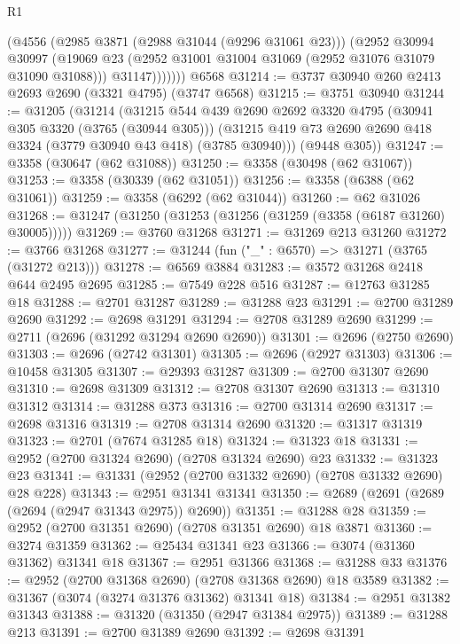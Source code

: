 \begin{lexlean}{R1}
\begin{coremodule}
              (@4556
                (@2985 @3871 (@2988 @31044 (@9296 @31061 @23)))
                (@2952
                  @30994
                  @30997
                  (@19069 @23 (@2952 @31001 @31004 @31069 (@2952 @31076 @31079 @31090 @31088)))
                  @31147)))))))
    @6568
@31214 := @3737 @30940 @260 @2413 @2693 @2690 (@3321 @4795) (@3747 @6568)
@31215 := @3751 @30940
@31244 := @31205
    (@31214
      (@31215
        @544
        @439
        @2690
        @2692
        @3320
        @4795
        (@30941 @305 @3320 (@3765 (@30944 @305)))
        (@31215 @419 @73 @2690 @2690 @418 @3324 (@3779 @30940 @43 @418) (@3785 @30940)))
      (@9448 @305))
@31247 := @3358 (@30647 (@62 @31088))
@31250 := @3358 (@30498 (@62 @31067))
@31253 := @3358 (@30339 (@62 @31051))
@31256 := @3358 (@6388 (@62 @31061))
@31259 := @3358 (@6292 (@62 @31044))
@31260 := @62 @31026
@31268 := @31247 (@31250 (@31253 (@31256 (@31259 (@3358 (@6187 @31260) @30005)))))
@31269 := @3760 @31268
@31271 := @31269 @213 @31260
@31272 := @3766 @31268
@31277 := @31244 (fun ("_" : @6570) => @31271 (@3765 (@31272 @213)))
@31278 := @6569 @3884
@31283 := @3572 @31268 @2418 @644 @2495 @2695
@31285 := @7549 @228 @516
@31287 := @12763 @31285 @18
@31288 := @2701 @31287
@31289 := @31288 @23
@31291 := @2700 @31289 @2690
@31292 := @2698 @31291
@31294 := @2708 @31289 @2690
@31299 := @2711 (@2696 (@31292 @31294 @2690 @2690))
@31301 := @2696 (@2750 @2690)
@31303 := @2696 (@2742 @31301)
@31305 := @2696 (@2927 @31303)
@31306 := @10458 @31305
@31307 := @29393 @31287
@31309 := @2700 @31307 @2690
@31310 := @2698 @31309
@31312 := @2708 @31307 @2690
@31313 := @31310 @31312
@31314 := @31288 @373
@31316 := @2700 @31314 @2690
@31317 := @2698 @31316
@31319 := @2708 @31314 @2690
@31320 := @31317 @31319
@31323 := @2701 (@7674 @31285 @18)
@31324 := @31323 @18
@31331 := @2952 (@2700 @31324 @2690) (@2708 @31324 @2690) @23
@31332 := @31323 @23
@31341 := @31331 (@2952 (@2700 @31332 @2690) (@2708 @31332 @2690) @28 @228)
@31343 := @2951 @31341 @31341
@31350 := @2689 (@2691 (@2689 (@2694 (@2947 @31343 @2975)) @2690))
@31351 := @31288 @28
@31359 := @2952 (@2700 @31351 @2690) (@2708 @31351 @2690) @18 @3871
@31360 := @3274 @31359
@31362 := @25434 @31341 @23
@31366 := @3074 (@31360 @31362) @31341 @18
@31367 := @2951 @31366
@31368 := @31288 @33
@31376 := @2952 (@2700 @31368 @2690) (@2708 @31368 @2690) @18 @3589
@31382 := @31367 (@3074 (@3274 @31376 @31362) @31341 @18)
@31384 := @2951 @31382 @31343
@31388 := @31320 (@31350 (@2947 @31384 @2975))
@31389 := @31288 @213
@31391 := @2700 @31389 @2690
@31392 := @2698 @31391

\end{coremodule}
\end{lexlean}
